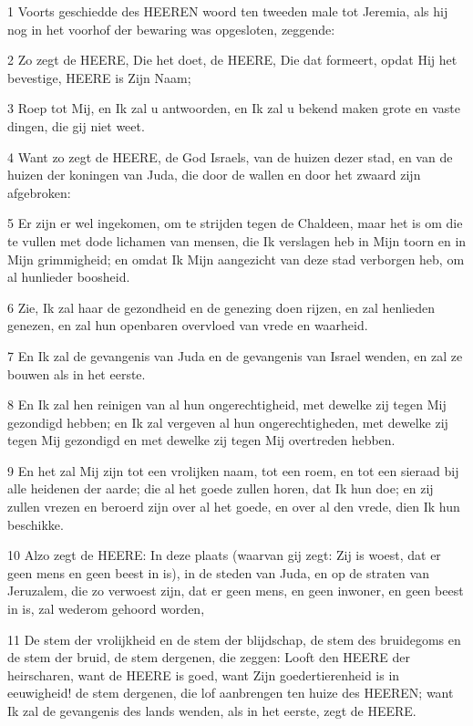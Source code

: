 \par 1 Voorts geschiedde des HEEREN woord ten tweeden male tot Jeremia, als hij nog in het voorhof der bewaring was opgesloten, zeggende:
\par 2 Zo zegt de HEERE, Die het doet, de HEERE, Die dat formeert, opdat Hij het bevestige, HEERE is Zijn Naam;
\par 3 Roep tot Mij, en Ik zal u antwoorden, en Ik zal u bekend maken grote en vaste dingen, die gij niet weet.
\par 4 Want zo zegt de HEERE, de God Israels, van de huizen dezer stad, en van de huizen der koningen van Juda, die door de wallen en door het zwaard zijn afgebroken:
\par 5 Er zijn er wel ingekomen, om te strijden tegen de Chaldeen, maar het is om die te vullen met dode lichamen van mensen, die Ik verslagen heb in Mijn toorn en in Mijn grimmigheid; en omdat Ik Mijn aangezicht van deze stad verborgen heb, om al hunlieder boosheid.
\par 6 Zie, Ik zal haar de gezondheid en de genezing doen rijzen, en zal henlieden genezen, en zal hun openbaren overvloed van vrede en waarheid.
\par 7 En Ik zal de gevangenis van Juda en de gevangenis van Israel wenden, en zal ze bouwen als in het eerste.
\par 8 En Ik zal hen reinigen van al hun ongerechtigheid, met dewelke zij tegen Mij gezondigd hebben; en Ik zal vergeven al hun ongerechtigheden, met dewelke zij tegen Mij gezondigd en met dewelke zij tegen Mij overtreden hebben.
\par 9 En het zal Mij zijn tot een vrolijken naam, tot een roem, en tot een sieraad bij alle heidenen der aarde; die al het goede zullen horen, dat Ik hun doe; en zij zullen vrezen en beroerd zijn over al het goede, en over al den vrede, dien Ik hun beschikke.
\par 10 Alzo zegt de HEERE: In deze plaats (waarvan gij zegt: Zij is woest, dat er geen mens en geen beest in is), in de steden van Juda, en op de straten van Jeruzalem, die zo verwoest zijn, dat er geen mens, en geen inwoner, en geen beest in is, zal wederom gehoord worden,
\par 11 De stem der vrolijkheid en de stem der blijdschap, de stem des bruidegoms en de stem der bruid, de stem dergenen, die zeggen: Looft den HEERE der heirscharen, want de HEERE is goed, want Zijn goedertierenheid is in eeuwigheid! de stem dergenen, die lof aanbrengen ten huize des HEEREN; want Ik zal de gevangenis des lands wenden, als in het eerste, zegt de HEERE.
